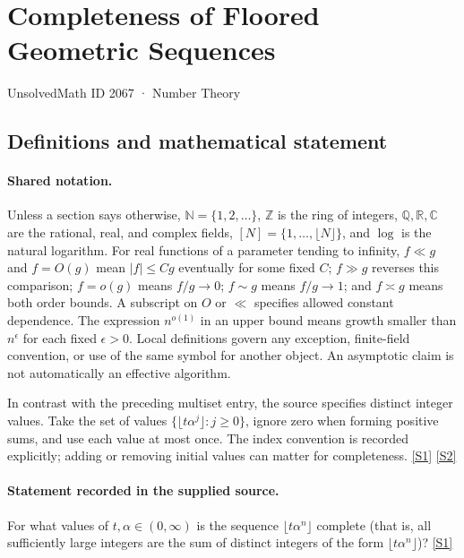 \documentclass[11pt,a4paper]{article}
\newcommand{\N}{\mathbb{N}}
\newcommand{\Z}{\mathbb{Z}}
\newcommand{\Q}{\mathbb{Q}}
\newcommand{\R}{\mathbb{R}}
\newcommand{\C}{\mathbb{C}}
\newcommand{\sref}[2]{\hyperlink{source:#1:#2}{[S#2]}}
\begin{document}

\setcounter{section}{2066}

\section{Completeness of Floored Geometric Sequences}\label{2067}

{\small\sffamily UnsolvedMath ID 2067 · Number Theory}

\subsection{Definitions and mathematical statement}

\paragraph{Shared notation.}Unless a section says otherwise, $\N=\{1,2,\ldots\}$,
$\Z$ is the ring of integers, $\Q,\R,\C$ are the rational, real, and complex
fields, $[N]=\{1,\ldots,\lfloor N\rfloor\}$, and $\log$ is the natural
logarithm. For real functions of a parameter tending to infinity,
$f\ll g$ and $f=O(g)$ mean $|f|\leq Cg$ eventually for some fixed $C$;
$f\gg g$ reverses this comparison; $f=o(g)$ means $f/g\to0$;
$f\sim g$ means $f/g\to1$; and $f\asymp g$ means both order bounds.
A subscript on $O$ or $\ll$ specifies allowed constant dependence.
The expression $n^{o(1)}$ in an upper bound means growth smaller than
$n^\epsilon$ for each fixed $\epsilon>0$. Local definitions govern any
exception, finite-field convention, or use of the same symbol for another
object. An asymptotic claim is not automatically an effective algorithm.



In contrast with the preceding multiset entry, the source specifies distinct integer values. Take the set of values $\{\lfloor t\alpha^j\rfloor:j\geq0\}$, ignore zero when forming positive sums, and use each value at most once. The index convention is recorded explicitly; adding or removing initial values can matter for completeness. \sref{2067}{1} \sref{2067}{2}

\paragraph{Statement recorded in the supplied source.}
For what values of $t,\alpha \in (0,\infty)$ is the sequence $\lfloor t\alpha^n\rfloor$ complete (that is, all sufficiently large integers are the sum of distinct integers of the form $\lfloor t\alpha^n\rfloor$)? \sref{2067}{1}
\end{document}

